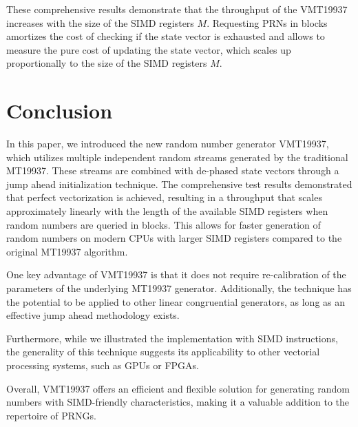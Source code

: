\documentclass[preprint,1p,times]{elsarticle}
\begin{document}
			These comprehensive results demonstrate that the throughput of the VMT19937 increases with the size of the SIMD registers $M$. Requesting PRNs in blocks amortizes the cost of checking if the state vector is exhausted and allows to measure the pure cost of updating the state vector, which scales up proportionally to the size of the SIMD registers $M$.
			
			\section{Conclusion}
			In this paper, we introduced the new random number generator VMT19937, which utilizes multiple independent random streams generated by the traditional MT19937. These streams are combined with de-phased state vectors through a jump ahead initialization technique. The comprehensive test results demonstrated that perfect vectorization is achieved, resulting in a throughput that scales approximately linearly with the length of the available SIMD registers when random numbers are queried in blocks. This allows for faster generation of random numbers on modern CPUs with larger SIMD registers compared to the original MT19937 algorithm.
			
			One key advantage of VMT19937 is that it does not require re-calibration of the parameters of the underlying MT19937 generator. Additionally, the technique has the potential to be applied to other linear congruential generators, as long as an effective jump ahead methodology exists.
			
			Furthermore, while we illustrated the implementation with SIMD instructions, the generality of this technique suggests its applicability to other vectorial processing systems, such as GPUs or FPGAs.
			
			Overall, VMT19937 offers an efficient and flexible solution for generating random numbers with SIMD-friendly characteristics, making it a valuable addition to the repertoire of PRNGs.
			
\end{document}
